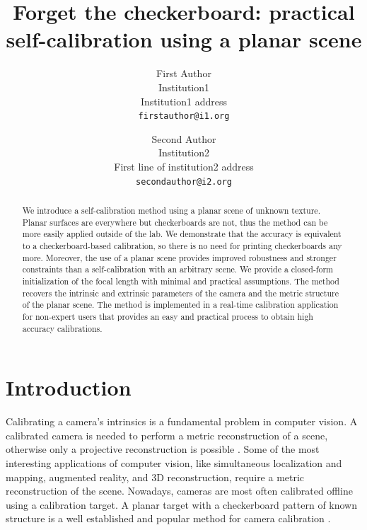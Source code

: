 \documentclass[10pt,twocolumn,letterpaper]{article}
\begin{document}
\title{Forget the checkerboard: practical self-calibration using a planar scene}

\author{First Author\\
Institution1\\
Institution1 address\\
{\tt\small firstauthor@i1.org}
\and
Second Author\\
Institution2\\
First line of institution2 address\\
{\tt\small secondauthor@i2.org}
}

\maketitle


\begin{abstract}
We introduce a self-calibration method using a planar scene of unknown texture. Planar surfaces are everywhere but checkerboards are not, thus the method can be more easily applied outside of the lab. We demonstrate that the accuracy is equivalent to a checkerboard-based calibration, so there is no need for printing checkerboards any more. Moreover, the use of a planar scene provides improved robustness and stronger constraints than a self-calibration with an arbitrary scene. We provide a closed-form initialization of the focal length with minimal and practical assumptions. The method recovers the intrinsic and extrinsic parameters of the camera and the metric structure of the planar scene. The method is implemented in a real-time calibration application for non-expert users that provides an easy and practical process to obtain high accuracy calibrations. 
\end{abstract}

\section{Introduction}

Calibrating a camera's intrinsics is a fundamental problem in computer vision. A calibrated camera is needed to perform a metric reconstruction of a scene, otherwise only a projective reconstruction is possible \cite{hartley2000}. Some of the most interesting applications of computer vision, like simultaneous localization and mapping, augmented reality, and 3D reconstruction, require a metric reconstruction of the scene. Nowadays, cameras are most often calibrated offline using a calibration target. A planar target with a checkerboard pattern of known structure is a well established and popular method for camera calibration \cite{zhang1999,bouguetMCT}.
\end{document}
